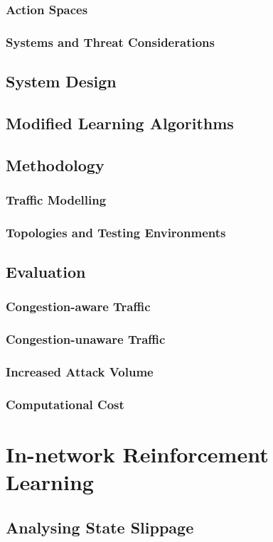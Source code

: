 \documentclass[twoside,hidelinks]{glasgowthesis}
\begin{document}
\subsection{Action Spaces}
\subsection{Systems and Threat Considerations}
\section{System Design}
\section{Modified Learning Algorithms}
\section{Methodology}
\subsection{Traffic Modelling}
\subsection{Topologies and Testing Environments}
\section{Evaluation}
\subsection{Congestion-aware Traffic}
\subsection{Congestion-unaware Traffic}
\subsection{Increased Attack Volume}
\subsection{Computational Cost}

\chapter{In-network Reinforcement Learning}
\section{Analysing State Slippage}
\end{document}
